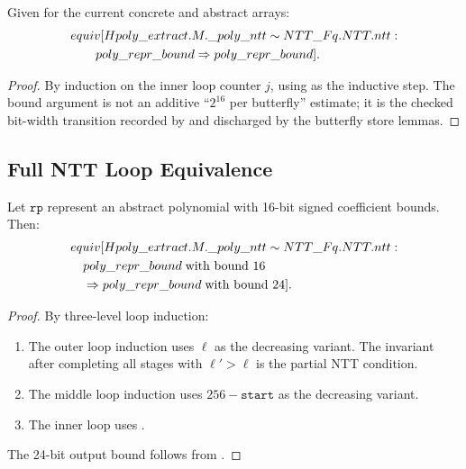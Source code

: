 \begin{lemma}
  Given  for the current concrete and abstract arrays:
  \[
  \begin{aligned}
    &equiv[
      Hpoly\_extract.M.\_poly\_ntt
      \sim NTT\_Fq.NTT.ntt:\\
    &\qquad
      poly\_repr\_bound \Rightarrow poly\_repr\_bound].
  \end{aligned}
  \]
\label{lem:inner_corr}
\end{lemma}

\begin{proof}
  By induction on the inner loop counter $j$, using 
  as the inductive step.  The bound argument is not an additive
  ``\(2^{16}\) per butterfly'' estimate; it is the checked bit-width
  transition recorded by  and discharged by the
  butterfly store lemmas.
\end{proof}

\subsection{Full NTT Loop Equivalence}

\begin{theorem}
  Let $\texttt{rp}$ represent an abstract polynomial with 16-bit signed
  coefficient bounds.  Then:
  \begin{align*}
    &equiv[Hpoly\_extract.M.\_poly\_ntt \sim NTT\_Fq.NTT.ntt : \\
    &\quad poly\_repr\_bound\;\text{with bound }16 \\
    &\quad \Rightarrow poly\_repr\_bound\;\text{with bound }24].
  \end{align*}
\label{thm:ntt_loop_equiv}
\end{theorem}

\begin{proof}
  By three-level loop induction:
  \begin{enumerate}
    \item The outer loop induction uses $\ell$ as the decreasing variant.
          The invariant after completing all stages with $\ell' > \ell$ is
          the partial NTT condition.
    \item The middle loop induction uses $256 - \texttt{start}$ as the
          decreasing variant.
    \item The inner loop uses .
  \end{enumerate}
  The 24-bit output bound follows from .
\end{proof}

